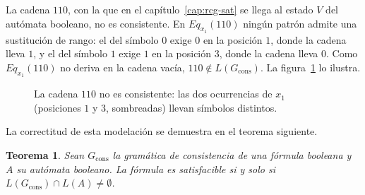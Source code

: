\documentclass{report}
\theoremstyle{definition}
\theoremstyle{plain}
\newtheorem{teorema}{Teorema}[chapter]
\begin{document}
La cadena $110$, con la que en el capítulo~\ref{cap:rcg-sat} se llega
al estado $V$ del autómata booleano, no es consistente. En
$Eq_{x_1}(110)$ ningún patrón admite una sustitución de rango: el del
símbolo $0$ exige $0$ en la posición $1$, donde la cadena lleva $1$, y
el del símbolo $1$ exige $1$ en la posición $3$, donde la cadena lleva
$0$.
Como $Eq_{x_1}(110)$ no deriva en la cadena vacía,
$110 \notin L(G_{\mathrm{cons}})$. La
figura~\ref{fig:no-consistencia-110} lo ilustra.

\begin{figure}[ht]
\centering
{}
\caption[La cadena $110$ no es consistente]{La cadena $110$ no es consistente: las dos ocurrencias de
$x_1$ (posiciones $1$ y $3$, sombreadas) llevan símbolos distintos.}
\label{fig:no-consistencia-110}
\end{figure}

La correctitud de esta modelación se demuestra en el teorema
siguiente.

\begin{teorema}
\label{teo:sat-vacio-interseccion}
Sean $G_{\mathrm{cons}}$ la gramática de consistencia de una fórmula
booleana y $A$ su autómata booleano. La fórmula es satisfacible si y
solo si $L(G_{\mathrm{cons}}) \cap L(A) \neq \emptyset$.
\end{teorema}
\end{document}
